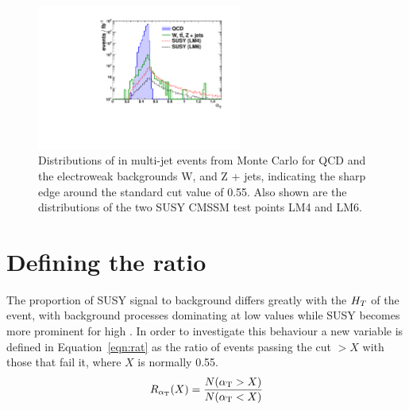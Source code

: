 \begin{figure}[htbp]
\begin{center}
\includegraphics[width=0.6\textwidth]{Figures/AlphaT/ThesisATPlot}
\caption[Distributions of \alt in multi-jet events from Monte Carlo for QCD and the electroweak backgrounds W, \tto and Z + jets, indicating the sharp edge around the standard cut value of 0.55.]{\label{fig:atedge}Distributions of \alt in multi-jet events from Monte Carlo for QCD and the electroweak backgrounds W, \tto and Z + jets, indicating the sharp edge around the standard cut value of 0.55. Also shown are the distributions of the two SUSY CMSSM test points LM4 and LM6.}
\end{center}
\end{figure}


\section{Defining the ratio \RaT}
\label{sec:atrat}

The proportion of SUSY signal to background differs greatly with the $H_{T}$ of the event, with background processes dominating at low values while SUSY becomes more prominent for high \HT. In order to investigate this behaviour a new variable \RaT is defined in Equation~\ref{eqn:rat} as the ratio of events passing the cut \alt $> X$ with those that fail it, where $X$ is normally 0.55. 
\begin{equation}
R_{\alpha_{\text{T}}}(X) = \frac{N(\alpha_{\text{T}} > X)}{N(\alpha_{\text{T}} < X)}
\label{eqn:rat}
\end{equation}

